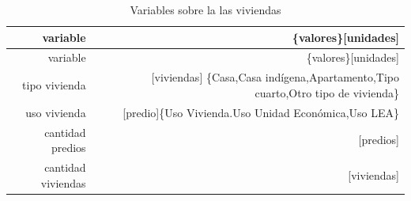 \documentclass[12pt,]{book}
\begin{document}
\begin{longtable}[]{@{}rr@{}}
\caption{\label{tab:vars-vivienda} Variables sobre la las
viviendas}\tabularnewline
\toprule
\begin{minipage}[b]{0.09\columnwidth}\raggedleft\strut
variable\strut
\end{minipage} & \begin{minipage}[b]{0.38\columnwidth}\raggedleft\strut
\{valores\}{[}unidades{]}\strut
\end{minipage}\tabularnewline
\midrule
\endfirsthead
\toprule
\begin{minipage}[b]{0.09\columnwidth}\raggedleft\strut
variable\strut
\end{minipage} & \begin{minipage}[b]{0.38\columnwidth}\raggedleft\strut
\{valores\}{[}unidades{]}\strut
\end{minipage}\tabularnewline
\midrule
\endhead
\begin{minipage}[t]{0.09\columnwidth}\raggedleft\strut
tipo vivienda\strut
\end{minipage} & \begin{minipage}[t]{0.38\columnwidth}\raggedleft\strut
{[}viviendas{]} \{Casa,Casa indígena,Apartamento,Tipo cuarto,Otro tipo
de vivienda\}\strut
\end{minipage}\tabularnewline
\begin{minipage}[t]{0.09\columnwidth}\raggedleft\strut
uso vivienda\strut
\end{minipage} & \begin{minipage}[t]{0.38\columnwidth}\raggedleft\strut
{[}predio{]}\{Uso Vivienda.Uso Unidad Económica,Uso LEA\}\strut
\end{minipage}\tabularnewline
\begin{minipage}[t]{0.09\columnwidth}\raggedleft\strut
cantidad predios\strut
\end{minipage} & \begin{minipage}[t]{0.38\columnwidth}\raggedleft\strut
{[}predios{]}\strut
\end{minipage}\tabularnewline
\begin{minipage}[t]{0.09\columnwidth}\raggedleft\strut
cantidad viviendas\strut
\end{minipage} & \begin{minipage}[t]{0.38\columnwidth}\raggedleft\strut
{[}viviendas{]}\strut
\end{minipage}\tabularnewline
\bottomrule
\end{longtable}
\end{document}
